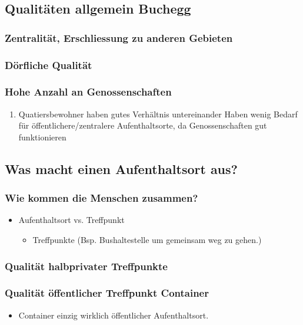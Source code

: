 \documentclass[a4paper,ngerman,11pt]{scrartcl}
\begin{document}
\subsection{Qualitäten allgemein Buchegg}
\label{sec-3-4}
\subsubsection{Zentralität, Erschliessung zu anderen Gebieten}
\label{sec-3-4-1}
\subsubsection{Dörfliche Qualität}
\label{sec-3-4-2}
\subsubsection{Hohe Anzahl an Genossenschaften}
\label{sec-3-4-3}
\begin{enumerate}
\item Quatiersbewohner haben gutes Verhältnis untereinander
\label{sec-3-4-3-1}
Haben wenig Bedarf für öffentlichere/zentralere Aufenthaltsorte, da
Genossenschaften gut funktionieren
\end{enumerate}

\subsection{Was macht einen Aufenthaltsort aus?}
\label{sec-3-5}
\subsubsection{Wie kommen die Menschen zusammen?}
\label{sec-3-5-1}
\begin{itemize}
\item Aufenthaltsort vs. Treffpunkt
\begin{itemize}
\item Treffpunkte (Bsp. Bushaltestelle um gemeinsam weg zu gehen.)
\end{itemize}
\end{itemize}
\subsubsection{Qualität halbprivater Treffpunkte}
\label{sec-3-5-2}
\subsubsection{Qualität öffentlicher Treffpunkt Container}
\label{sec-3-5-3}
\begin{itemize}
\item Container einzig wirklich öffentlicher Aufenthaltsort.
\end{itemize}
\end{document}
